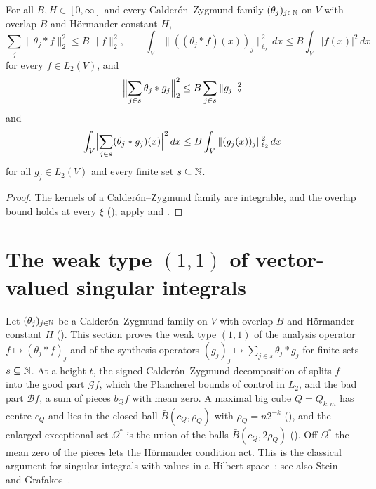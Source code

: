 \begin{corollary}
\label{cor:cz-family-l2-bounds}
\leanok
{}
For all $B, H \in [0, \infty]$ and every Calder\'on--Zygmund family $(\theta_j)_{j \in \mathbb{N}}$ on
$V$ with overlap $B$ and H\"ormander constant $H$,
\[
  \sum_j \|\theta_j * f\|_2^2 \leq B \, \|f\|_2^2 , \qquad
  \int_V \|((\theta_j * f)(x))_j\|_{\ell_2}^2 \, dx \leq B \int_V |f(x)|^2 \, dx
\]
for every $f \in L_2(V)$, and
\[
  \Bigl\|\sum_{j \in s} \theta_j * g_j\Bigr\|_2^2 \leq B \sum_{j \in s} \|g_j\|_2^2
\]
and
\[
  \int_V \Bigl|\sum_{j \in s} (\theta_j * g_j)(x)\Bigr|^2 \, dx
  \leq B \int_V \|(g_j(x))_j\|_{\ell_2}^2 \, dx
\]
for all $g_j \in L_2(V)$ and every finite set $s \subseteq \mathbb{N}$.
\end{corollary}

\begin{proof}
\leanok
The kernels of a Calder\'on--Zygmund family are integrable, and the overlap bound holds at
every $\xi$ (); apply  and
.
\end{proof}

\section{The weak type \texorpdfstring{$(1,1)$}{(1,1)} of vector-valued singular integrals}
\label{sec:vector-valued-weak-type}

Let $(\theta_j)_{j \in \mathbb{N}}$ be a Calder\'on--Zygmund family on $V$ with overlap $B$ and
H\"ormander constant $H$ (). This section proves the weak type $(1,1)$ of
the analysis operator $f \mapsto (\theta_j * f)_j$ and of the synthesis operators
$(g_j)_j \mapsto \sum_{j \in s} \theta_j * g_j$ for finite sets $s \subseteq \mathbb{N}$. At a height
$t$, the signed Calder\'on--Zygmund decomposition of  splits
$f$ into the good part $\mathcal G f$, which the Plancherel bounds of
 control in $L_2$, and the bad part $\mathcal B f$, a sum of
pieces $b_Q f$ with mean zero. A maximal big cube $Q = Q_{k,m}$ has centre $c_Q$ and lies in the
closed ball $\bar B(c_Q, \rho_Q)$ with $\rho_Q = n 2^{-k}$ (), and the
enlarged exceptional set $\Omega^*$ is the union of the balls $\bar B(c_Q, 2 \rho_Q)$
(). Off $\Omega^*$ the mean zero of the pieces lets the
H\"ormander condition act. This is the classical argument for singular integrals with values in a
Hilbert space~\cite{BenedekCalderonPanzone}; see also Stein~\cite{SteinSingular} and
Grafakos~\cite{Grafakos}.

